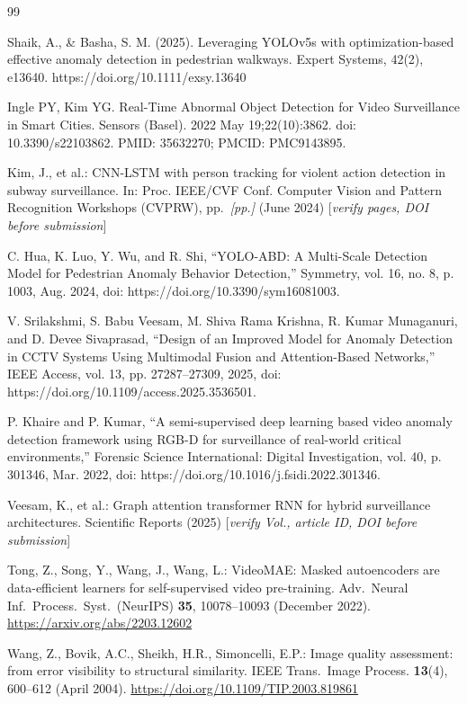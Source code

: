 \documentclass[runningheads]{llncs}
\begin{document}
\begin{thebibliography}{99}

Shaik, A., \& Basha, S. M. (2025). Leveraging YOLOv5s with optimization-based effective anomaly detection in pedestrian walkways. Expert Systems, 42(2), e13640. https://doi.org/10.1111/exsy.13640

Ingle PY, Kim YG. Real-Time Abnormal Object Detection for Video Surveillance in Smart Cities. Sensors (Basel). 2022 May 19;22(10):3862. doi: 10.3390/s22103862. PMID: 35632270; PMCID: PMC9143895.

Kim, J., et al.: CNN-LSTM with person tracking for violent action detection in subway surveillance. In: Proc. IEEE/CVF Conf. Computer Vision and Pattern Recognition Workshops (CVPRW), pp.\ \textit{[pp.]} (June 2024) [\textit{verify pages, DOI before submission}]

C. Hua, K. Luo, Y. Wu, and R. Shi, “YOLO-ABD: A Multi-Scale Detection Model for Pedestrian Anomaly Behavior Detection,” Symmetry, vol. 16, no. 8, p. 1003, Aug. 2024, doi: https://doi.org/10.3390/sym16081003.

V. Srilakshmi, S. Babu Veesam, M. Shiva Rama Krishna, R. Kumar Munaganuri, and D. Devee Sivaprasad, “Design of an Improved Model for Anomaly Detection in CCTV Systems Using Multimodal Fusion and Attention-Based Networks,” IEEE Access, vol. 13, pp. 27287–27309, 2025, doi: https://doi.org/10.1109/access.2025.3536501.

P. Khaire and P. Kumar, “A semi-supervised deep learning based video anomaly detection framework using RGB-D for surveillance of real-world critical environments,” Forensic Science International: Digital Investigation, vol. 40, p. 301346, Mar. 2022, doi: https://doi.org/10.1016/j.fsidi.2022.301346.

Veesam, K., et al.: Graph attention transformer RNN for hybrid surveillance architectures. Scientific Reports (2025) [\textit{verify Vol., article ID, DOI before submission}]

Tong, Z., Song, Y., Wang, J., Wang, L.: VideoMAE: Masked autoencoders are data-efficient learners for self-supervised video pre-training. Adv.\ Neural Inf.\ Process.\ Syst.\ (NeurIPS) \textbf{35}, 10078--10093 (December 2022). \url{https://arxiv.org/abs/2203.12602}

Wang, Z., Bovik, A.C., Sheikh, H.R., Simoncelli, E.P.: Image quality assessment: from error visibility to structural similarity. IEEE Trans.\ Image Process. \textbf{13}(4), 600--612 (April 2004). \url{https://doi.org/10.1109/TIP.2003.819861}


\end{thebibliography}
\end{document}
